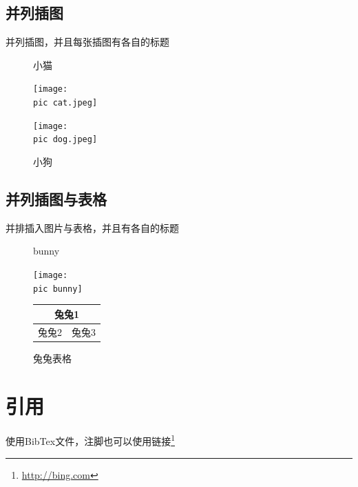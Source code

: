 \documentclass[10pt,a4paper,utf8]{article}
\newcommand{\pic}{./pic/}
\begin{document}
\begin{CJK}{UTF8}{gbsn}
\subsection{并列插图}
并列插图，并且每张插图有各自的标题
\begin{figure}[H]
\CenterFloatBoxes
\begin{floatrow}
\begin{ffigbox}
{\caption{小猫}\label{fig:cat}}
{\texttt{[image: \\pic cat.jpeg]}}
\end{ffigbox}
\begin{ffigbox}
{\caption{小狗}\label{fig:dog}}
{\texttt{[image: \\pic dog.jpeg]}}
\end{ffigbox}
\end{floatrow}
\end{figure}
\subsection{并列插图与表格}
并排插入图片与表格，并且有各自的标题
\begin{figure}[H]
\CenterFloatBoxes
\begin{floatrow}
\begin{ffigbox}
{\caption{bunny}}
{\texttt{[image: \\pic bunny]}}
\end{ffigbox}
\begin{ttabbox}
{\caption{兔兔表格}}
{\begin{tabular}{|c|c|}
\hline 
\multicolumn{2}{|c|}{兔兔1} \\ 
\hline 
兔兔2 & 兔兔3 \\ 
\hline 
\end{tabular} }
\end{ttabbox}
\end{floatrow}
\end{figure}
\section{引用}
使用BibTex文件\cite{citekey}，注脚也可以使用链接\footnote{\url{http://bing.com}}
\newpage



\end{CJK}
\end{document}
